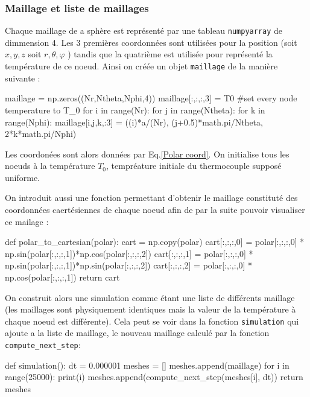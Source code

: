 \documentclass[fleqn]{article}
\renewcommand{\phi}{\varphi}
\begin{document}
 \subsubsection{Maillage et liste de maillages}
Chaque maillage de a sphère est représenté par une tableau \texttt{numpyarray} de dimmension 4. Les 3 premières coordonnées sont utilisées pour la position (soit $x,y,z$ soit $r, \theta, \phi$ ) tandis que la quatrième est utilisée pour représenté la température de ce noeud. Ainsi on créée un objet \texttt{maillage} de la manière suivante :


\begin{python}
    maillage = np.zeros((Nr,Ntheta,Nphi,4))
    maillage[:,:,:,3] = T0                  #set every node temperature to T_0
    for i in range(Nr):
        for j in range(Ntheta):
            for k in range(Nphi):
                maillage[i,j,k,:3] = ((i)*a/(Nr), (j+0.5)*math.pi/Ntheta, 2*k*math.pi/Nphi)

\end{python}
Les coordonées sont alors données par Eq.\eqref{Polar coord}. On initialise tous les noeuds à la température $T_0$, tempréature initiale du thermocouple supposé uniforme. 

On introduit aussi une fonction permettant d'obtenir le maillage constituté des coordonnées caertésiennes de chaque noeud afin de par la suite pouvoir visualiser ce mailage :
\begin{python}
    def polar_to_cartesian(polar):
        cart = np.copy(polar)
        cart[:,:,:,0] = polar[:,:,:,0] * np.sin(polar[:,:,:,1])*np.cos(polar[:,:,:,2])
        cart[:,:,:,1] = polar[:,:,:,0] * np.sin(polar[:,:,:,1])*np.sin(polar[:,:,:,2])
        cart[:,:,:,2] = polar[:,:,:,0] * np.cos(polar[:,:,:,1])
        return cart
\end{python}

On construit alors une simulation comme étant une liste de différents maillage (les maillages sont physiquement identiques mais la valeur de la température à chaque noeud est différente).
Cela peut se voir dans la fonction \texttt{simulation} qui ajoute a la liste de maillage, le nouveau maillage calculé par la fonction \texttt{compute\_next\_step}:

\begin{python}
    def simulation():
    dt = 0.000001
    meshes = []
    meshes.append(maillage)
    for i in range(25000):
        print(i)
        meshes.append(compute_next_step(meshes[i], dt))
    return meshes
\end{python}
\end{document}
